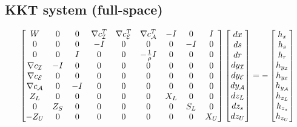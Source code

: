 \documentclass[10pt]{article}
\begin{document}
	\subsection*{KKT system (full-space)}
	\begin{equation}
		\begin{aligned}
			\begin{bmatrix}
				W & 0 & 0 & \nabla c_{\mathcal I}^T & \nabla c_{\mathcal E}^T & \nabla c_{\mathcal A}^T & -I & 0 & I \\
				0 & 0 & 0 & -I & 0 & 0 & 0 & -I & 0 \\
				0 & 0 & I & 0 & 0 & -\frac{1}{\rho} I & 0 & 0 & 0\\
				\nabla c_{\mathcal I} & -I & 0 & 0 & 0 & 0 & 0 & 0 & 0\\
				\nabla c_{\mathcal E} & 0 & 0 & 0 & 0 & 0 & 0 & 0 & 0\\
				\nabla c_{\mathcal A} & 0 & -I & 0 & 0 & 0 & 0 & 0 & 0\\
				Z_L & 0 & 0 & 0 & 0 & 0 & X_L & 0 & 0 \\
				0 & Z_S & 0 & 0 & 0 & 0 & 0 & S_L & 0 \\
				-Z_U & 0 & 0 & 0 & 0 & 0 & 0 & 0 & X_U\\
			\end{bmatrix}
			\begin{bmatrix}
				dx \\
				ds \\
				dr \\
				dy_{\mathcal I} \\
				dy_{\mathcal E} \\
				dy_{\mathcal A} \\
				dz_L \\
				dz_s \\
				dz_U \\
			\end{bmatrix}
			=
			-\begin{bmatrix}
				h_x \\
				h_s \\
				h_r \\
				h_{y_{\mathcal I}} \\
				h_{y_{\mathcal E}} \\
				h_{y_{\mathcal A}} \\
				h_{z_L} \\
				h_{z_s} \\
				h_{z_U} \\
			\end{bmatrix}
		\end{aligned} \notag
	\end{equation}
	 
\end{document}
